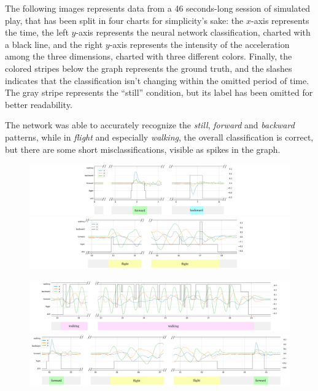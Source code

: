 The following images represents data from a 46 seconds-long session of simulated play, that has been split in four charts for simplicity's sake: the $x$-axis represents the time, the left $y$-axis represents the neural network classification, charted with a black line, and the right $y$-axis represents the intensity of the acceleration among the three dimensions, charted with three different colors. Finally, the colored stripes below the graph represents the ground truth, and the slashes indicates that the classification isn't changing within the omitted period of time. The gray stripe represents the ``still'' condition, but its label has been omitted for better readability.
\bigbreak

The network was able to accurately recognize the \textit{still}, \textit{forward} and \textit{backward} patterns, while in \textit{flight} and especially \textit{walking}, the overall classification is correct, but there are some short misclassifications, visible as spikes in the graph.

\clearpage
\begin{figure}
	\includegraphics[width=\textwidth]{img/plots/session/1.png}
	\vspace{2cm}

	\includegraphics[width=\textwidth]{img/plots/session/2.png}
\end{figure}
\clearpage

\clearpage
\begin{figure}
	\includegraphics[width=\textwidth]{img/plots/session/3.png}
	\vspace{2cm}

	\includegraphics[width=\textwidth]{img/plots/session/4.png}
\end{figure}
\clearpage
